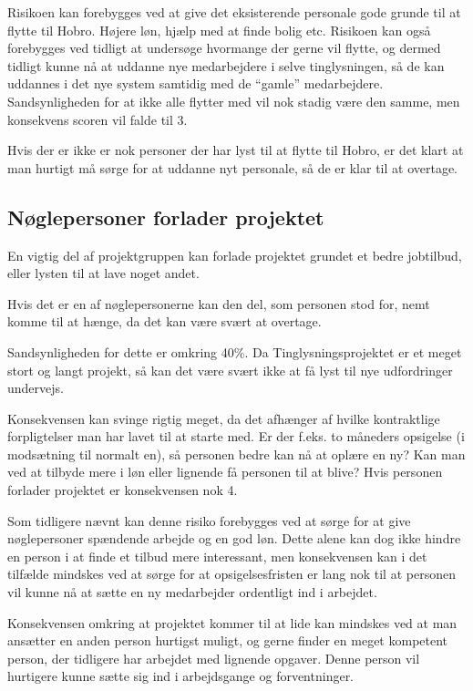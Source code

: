 \documentclass[10pt,a4paper,danish]{article}
\begin{document}
Risikoen kan forebygges ved at give det eksisterende personale gode grunde til at flytte til Hobro. Højere løn, hjælp med at finde bolig etc. Risikoen kan også forebygges ved tidligt at undersøge hvormange der gerne vil flytte, og dermed tidligt kunne nå at uddanne nye medarbejdere i selve tinglysningen, så de kan uddannes i det nye system samtidig med de "`gamle"' medarbejdere. Sandsynligheden for at ikke alle flytter med vil nok stadig være den samme, men konsekvens scoren vil falde til 3.

Hvis der er ikke er nok personer der har lyst til at flytte til Hobro, er det klart at man hurtigt må sørge for at uddanne nyt personale, så de er klar til at overtage.

\subsection{Nøglepersoner forlader projektet}
En vigtig del af projektgruppen kan forlade projektet grundet et bedre jobtilbud, eller lysten til at lave noget andet.

Hvis det er en af nøglepersonerne kan den del, som personen stod for, nemt komme til at hænge, da det kan være svært at overtage. 

Sandsynligheden for dette er omkring 40\%. Da Tinglysningsprojektet er et meget stort og langt projekt, så kan det være svært ikke at få lyst til nye udfordringer undervejs.

Konsekvensen kan svinge rigtig meget, da det afhænger af hvilke kontraktlige forpligtelser man har lavet til at starte med. Er der f.eks. to måneders opsigelse (i modsætning til normalt en), så personen bedre kan nå at oplære en ny? Kan man ved at tilbyde mere i løn eller lignende få personen til at blive? Hvis personen forlader projektet er konsekvensen nok 4.

Som tidligere nævnt kan denne risiko forebygges ved at sørge for at give nøglepersoner spændende arbejde og en god løn. Dette alene kan dog ikke hindre en person i at finde et tilbud mere interessant, men konsekvensen kan i det tilfælde mindskes ved at sørge for at opsigelsesfristen er lang nok til at personen vil kunne nå at sætte en ny medarbejder ordentligt ind i arbejdet.

Konsekvensen omkring at projektet kommer til at lide kan mindskes ved at man ansætter en anden person hurtigst muligt, og gerne finder en meget kompetent person, der tidligere har arbejdet med lignende opgaver. Denne person vil hurtigere kunne sætte sig ind i arbejdsgange og forventninger.
\end{document}
